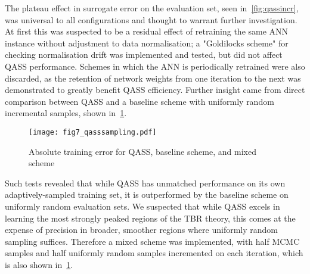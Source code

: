 The plateau effect in surrogate error on the evaluation set, seen
in~\cref{fig:qassincr}, was universal to all configurations and thought to
warrant further investigation. At first this was suspected to be a residual
effect of retraining the same ANN instance without adjustment to data
normalisation; a "Goldilocks scheme" for checking normalisation drift was
implemented and tested, but did not affect QASS performance. Schemes in which
the ANN is periodically retrained were also discarded, as the retention of
network weights from one iteration to the next was demonstrated to greatly
benefit QASS efficiency. Further insight came from direct comparison between
QASS and a baseline scheme with uniformly random incremental samples, shown
in~\cref{fig:qasssampling}.

\begin{figure}[h]
  \centering
    \texttt{[image: fig7\_qasssampling.pdf]}
    \caption{Absolute training error for QASS, baseline scheme, and mixed scheme}
  \label{fig:qasssampling}
\end{figure}

Such tests revealed that while QASS has unmatched performance on its own
adaptively-sampled training set, it is outperformed by the baseline scheme on
uniformly random evaluation sets. We suspected that while QASS excels in
learning the most strongly peaked regions of the TBR theory, this comes at the
expense of precision in broader, smoother regions where uniformly random
sampling suffices. Therefore a mixed scheme was implemented, with half MCMC
samples and half uniformly random samples incremented on each iteration, which
is also shown in~\cref{fig:qasssampling}.
